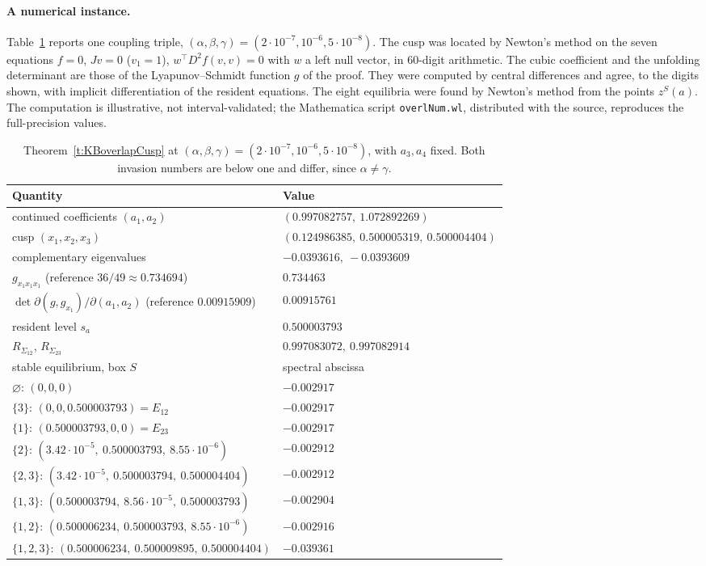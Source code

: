 \paragraph{A numerical instance.}
Table~\ref{tab:KBoverlapNum} reports one coupling triple,
$(\alpha,\beta,\gamma)=(2\cdot10^{-7},10^{-6},5\cdot10^{-8})$. The cusp was
located by Newton's method on the seven equations $f=0$, $Jv=0$ ($v_1=1$),
$w^\top D^2f(v,v)=0$ with $w$ a left null vector, in 60-digit arithmetic.
The cubic coefficient and the unfolding determinant are those of the
Lyapunov--Schmidt function $g$ of the proof. They were computed by central
differences and agree, to the digits shown, with implicit differentiation of
the resident equations. The eight equilibria were found by Newton's method from
the points $z^S(a)$. The computation is illustrative, not interval-validated;
the Mathematica script \texttt{overlNum.wl}, distributed with the source,
reproduces the full-precision values.
\begin{table}[H]
\centering\small
\begin{tabular}{ll}
\hline
Quantity & Value\\\hline
continued coefficients $(a_1,a_2)$ & $(0.997082757,\ 1.072892269)$\\
cusp $(x_1,x_2,x_3)$ & $(0.124986385,\ 0.500005319,\ 0.500004404)$\\
complementary eigenvalues & $-0.0393616,\ -0.0393609$\\
$g_{x_1x_1x_1}$ (reference $36/49\approx0.734694$) & $0.734463$\\
$\det\partial(g,g_{x_1})/\partial(a_1,a_2)$ (reference $0.00915909$) & $0.00915761$\\
resident level $s_a$ & $0.500003793$\\
$R_{\Sigma_{12}}$, $R_{\Sigma_{23}}$ & $0.997083072,\ 0.997082914$\\\hline
stable equilibrium, box $S$ & spectral abscissa\\\hline
$\varnothing$: $(0,0,0)$ & $-0.002917$\\
$\{3\}$: $(0,0,0.500003793)=E_{12}$ & $-0.002917$\\
$\{1\}$: $(0.500003793,0,0)=E_{23}$ & $-0.002917$\\
$\{2\}$: $(3.42\cdot10^{-5},\ 0.500003793,\ 8.55\cdot10^{-6})$ & $-0.002912$\\
$\{2,3\}$: $(3.42\cdot10^{-5},\ 0.500003794,\ 0.500004404)$ & $-0.002912$\\
$\{1,3\}$: $(0.500003794,\ 8.56\cdot10^{-5},\ 0.500003793)$ & $-0.002904$\\
$\{1,2\}$: $(0.500006234,\ 0.500003793,\ 8.55\cdot10^{-6})$ & $-0.002916$\\
$\{1,2,3\}$: $(0.500006234,\ 0.500009895,\ 0.500004404)$ & $-0.039361$\\\hline
\end{tabular}
\caption{Theorem~\ref{t:KBoverlapCusp} at
$(\alpha,\beta,\gamma)=(2\cdot10^{-7},10^{-6},5\cdot10^{-8})$, with $a_3,a_4$
fixed. Both invasion numbers are below one and differ, since $\alpha\ne\gamma$.}
\label{tab:KBoverlapNum}
\end{table}

